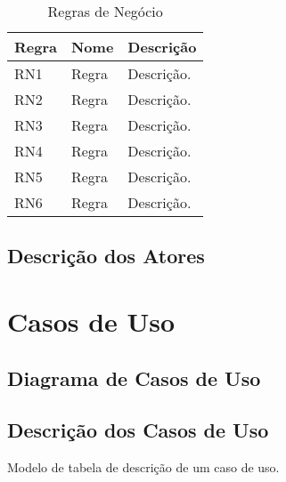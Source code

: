\begin{table}[htbp!]
  \caption{Regras de Negócio}
  \centering
      \begin{tabularx}{\textwidth}{|l|X|X|}
    \hline
      \textbf{Regra} & \textbf{Nome} & \textbf{Descrição}\\
      \hline
      RN1 & Regra & Descrição.\\
      \hline
      RN2 & Regra & Descrição.\\
      \hline
      RN3 & Regra & Descrição.\\
      \hline
      RN4 & Regra & Descrição.\\
      \hline
      RN5 & Regra & Descrição.\\
      \hline
      RN6 & Regra & Descrição.\\
      \hline 
      \end{tabularx}
  \label{regra}
\end{table}


\subsection{Descrição dos Atores}


\section{Casos de Uso}


\subsection{Diagrama de Casos de Uso}


\subsection{Descrição dos Casos de Uso}

Modelo de tabela de descrição de um caso de uso.

